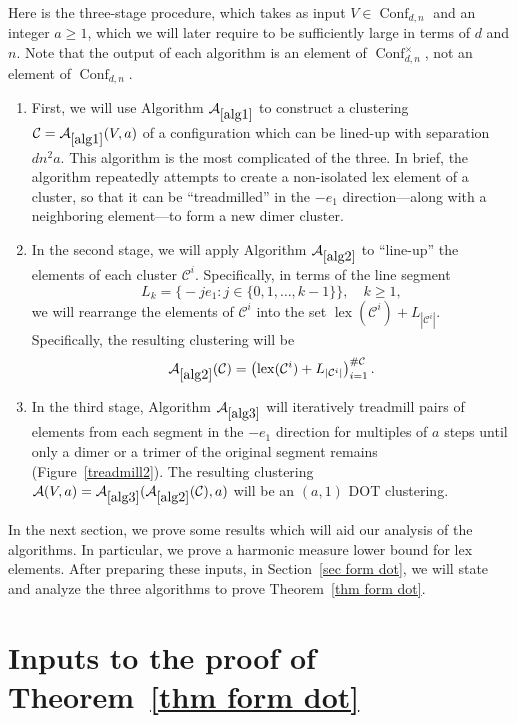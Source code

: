 \documentclass[11pt,reqno]{amsart}
\theoremstyle{definition}
\numberwithin{equation}{section}
\newcommand{\1}{\mathbf{1}}
\DeclareMathOperator{\lex}{lex}
\newcommand{\CC}{\mathcal{C}}
\DeclareMathOperator{\Conf}{\mathrm{Conf}}
\begin{document}
Here is the three-stage procedure, which takes as input $V \in \Conf_{d,n}$ and an integer $a \geq 1$, which we will later require to be sufficiently large in terms of $d$ and $n$. Note that the output of each algorithm is an element of $\Conf_{d,n}^\times$, not an element of $\Conf_{d,n}$.
\begin{enumerate}
\item First, we will use Algorithm $\mathcal{A}_{\ref{alg1}}$ to construct a clustering $\CC = \mathcal{A}_{\ref{alg1}} (V,a)$ of a configuration which can be lined-up with separation $dn^2 a$. This algorithm is the most complicated of the three. In brief, the algorithm repeatedly attempts to create a non-isolated lex element of a cluster, so that it can be ``treadmilled'' in the $-e_1$ direction---along with a neighboring element---to form a new dimer cluster. 
\item In the second stage, we will apply Algorithm $\mathcal{A}_{\ref{alg2}}$ to ``line-up'' the elements of each cluster $\CC^i$. Specifically, in terms of the line segment
\begin{equation}\label{line segment}
L_k = \big\{ -j e_1: j \in \{0,1,\dots,k-1\} \big\}, \quad k \geq 1,
\end{equation}
we will rearrange the elements of $\CC^i$ into the set $\lex (\CC^i) + L_{|\CC^i|}$. Specifically, the resulting clustering will be
\[ \mathcal{A}_{\ref{alg2}} (\CC) = \left( \lex (\CC^i) + L_{|\CC^i|} \right)_{i=1}^{\# \CC}.\]
\item In the third stage, Algorithm $\mathcal{A}_{\ref{alg3}}$ will iteratively treadmill pairs of elements from each segment in the $-e_1$ direction for multiples of $a$ steps until only a dimer or a trimer of the original segment remains (Figure~\ref{treadmill2}). The resulting clustering $\mathcal{A} (V,a) = \mathcal{A}_{\ref{alg3}} (\mathcal{A}_{\ref{alg2}} (\CC), a)$ will be an $(a,1)$ DOT clustering.
\end{enumerate} 

In the next section, we prove some results which will aid our analysis of the algorithms. In particular, we prove a harmonic measure lower bound for lex elements. After preparing these inputs, in Section~\ref{sec form dot}, we will state and analyze the three algorithms to prove Theorem~\ref{thm form dot}.


\section{Inputs to the proof of Theorem~\ref{thm form dot}}\label{sec inputs}
\end{document}
